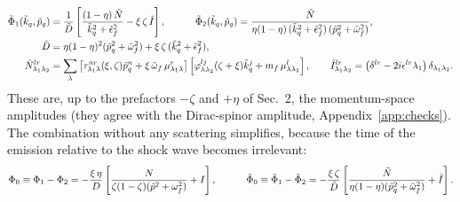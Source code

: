\documentclass[9pt]{article}
\numberwithin{equation}{section}
\begin{document}
\begin{align}\label{eq:Phiq}
    \Tilde{\Phi}_{1}(\Tilde{k}_{q},\Tilde{p}_{q}) & = \frac{1}{\Tilde{D}}\left[\frac{(1-\eta)\,\Tilde{N}}{\Tilde{k}^{2}_{q}+\Tilde{\epsilon}^{2}_{f}}-\xi\,\zeta\,\Tilde{I}\right], \hspace{3em} \Tilde{\Phi}_{2}(\Tilde{k}_{q},\Tilde{p}_{q}) = \frac{\Tilde{N}}{\eta(1-\eta)\,(\Tilde{k}^{2}_{q}+\Tilde{\epsilon}^{2}_{f})\,(\Tilde{p}^{2}_{q}+\Tilde{\omega}^{2}_{f})},\notag \\
    \Tilde{D} & = \eta(1-\eta)^{2}(\Tilde{p}^{2}_{q}+\Tilde{\omega}^{2}_{f})+\xi\,\zeta\,(\Tilde{k}^{2}_{q}+\Tilde{\epsilon}^{2}_{f}),\notag \\
    \Tilde{N}^{lr}_{\lambda_{1}\lambda_{2}} & = \sum_{\lambda}\left[\tau^{nr}_{\lambda_{1}\lambda}(\xi,\zeta)\Tilde{p}^{n}_{q}+\xi\,\Tilde{\omega}_{f}\,\mu^{r}_{\lambda_{1}\lambda}\right]\left[\varphi^{lj}_{\lambda\lambda_{2}}(\zeta+\xi)\Tilde{k}^{j}_{q}+m_{f}\,\mu^{l}_{\lambda\lambda_{2}}\right],\hspace{2em} \Tilde{I}^{lr}_{\lambda_{1}\lambda_{2}} = \left(\delta^{lr}-2i\epsilon^{lr}\lambda_{1}\right)\delta_{\lambda_{1}\lambda_{2}}.
\end{align}
These are, up to the prefactors $-\zeta$ and $+\eta$ of Sec.~2, the momentum-space amplitudes (they agree with the Dirac-spinor amplitude, Appendix~\ref{app:checks}). The combination without any scattering simplifies, because the time of the emission relative to the shock wave becomes irrelevant:
\begin{align}\label{eq:Phi0}
    \Phi_{0}\equiv\Phi_{1}-\Phi_{2} = -\frac{\xi\,\eta}{D}\left[\frac{N}{\zeta(1-\zeta)(\Tilde{p}^{2}+\omega^{2}_{f})}+I\right],\hspace{3em} \Tilde{\Phi}_{0}\equiv\Tilde{\Phi}_{1}-\Tilde{\Phi}_{2} = -\frac{\xi\,\zeta}{\Tilde{D}}\left[\frac{\Tilde{N}}{\eta(1-\eta)(\Tilde{p}^{2}_{q}+\Tilde{\omega}^{2}_{f})}+\Tilde{I}\right].
\end{align}
\end{document}
